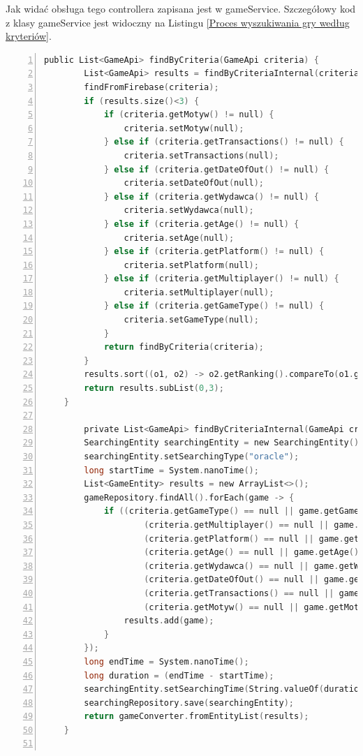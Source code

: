 Jak widać obsługa tego controllera zapisana jest w gameService. Szczegółowy kod z klasy gameService jest widoczny na Listingu \ref{Proces wyszukiwania gry według kryteriów}.
\begin{lstlisting}[language=C, mathescape, frame=single, numbers=left, xleftmargin=2em, framexleftmargin=2em, basicstyle=\ttfamily\bfseries, caption={Proces wyszukiwania gry według kryteriów}, label={Proces wyszukiwania gry według kryteriów}]
 public List<GameApi> findByCriteria(GameApi criteria) {
        List<GameApi> results = findByCriteriaInternal(criteria);
        findFromFirebase(criteria);
        if (results.size()<3) {
            if (criteria.getMotyw() != null) {
                criteria.setMotyw(null);
            } else if (criteria.getTransactions() != null) {
                criteria.setTransactions(null);
            } else if (criteria.getDateOfOut() != null) {
                criteria.setDateOfOut(null);
            } else if (criteria.getWydawca() != null) {
                criteria.setWydawca(null);
            } else if (criteria.getAge() != null) {
                criteria.setAge(null);
            } else if (criteria.getPlatform() != null) {
                criteria.setPlatform(null);
            } else if (criteria.getMultiplayer() != null) {
                criteria.setMultiplayer(null);
            } else if (criteria.getGameType() != null) {
                criteria.setGameType(null);
            }
            return findByCriteria(criteria);
        }
        results.sort((o1, o2) -> o2.getRanking().compareTo(o1.getRanking()));
        return results.subList(0,3);
    }
    
        private List<GameApi> findByCriteriaInternal(GameApi criteria) {
        SearchingEntity searchingEntity = new SearchingEntity();
        searchingEntity.setSearchingType("oracle");
        long startTime = System.nanoTime();
        List<GameEntity> results = new ArrayList<>();
        gameRepository.findAll().forEach(game -> {
            if ((criteria.getGameType() == null || game.getGameType().equals(criteria.getGameType())) &&
                    (criteria.getMultiplayer() == null || game.getMultiplayer().equals(criteria.getMultiplayer())) &&
                    (criteria.getPlatform() == null || game.getPlatform().equals(criteria.getPlatform())) &&
                    (criteria.getAge() == null || game.getAge() <= criteria.getAge()) &&
                    (criteria.getWydawca() == null || game.getWydawca().equals(criteria.getWydawca())) &&
                    (criteria.getDateOfOut() == null || game.getDateOfOut().equals(criteria.getDateOfOut())) &&
                    (criteria.getTransactions() == null || game.getTransactions().equals(criteria.getTransactions())) &&
                    (criteria.getMotyw() == null || game.getMotyw().equals(criteria.getMotyw()))) {
                results.add(game);
            }
        });
        long endTime = System.nanoTime();
        long duration = (endTime - startTime);
        searchingEntity.setSearchingTime(String.valueOf(duration/1_000));
        searchingRepository.save(searchingEntity);
        return gameConverter.fromEntityList(results);
    }


\end{lstlisting}
